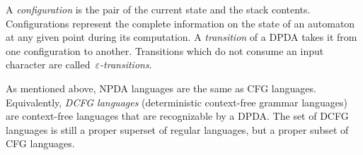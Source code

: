 A \emph{configuration} is the pair of the current state and the stack contents.
Configurations represent the complete information on the 
    state of an automaton at any given point during its computation.
A \emph{transition} of a DPDA takes it from one configuration to another.
Transitions which do not consume an input character are called~\emph{$ε$-transitions}.

As mentioned above, NPDA languages are the same as CFG languages.
Equivalently, \emph{DCFG languages} (deterministic context-free grammar languages)
  are context-free languages that are recognizable by a DPDA.
The set of DCFG languages is still a proper superset of regular languages,
  but a proper subset of CFG languages.
